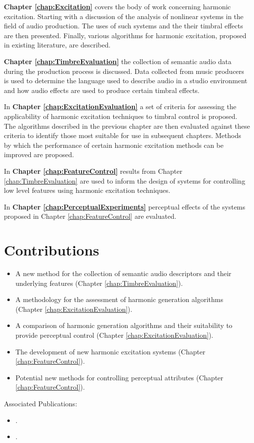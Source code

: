 	{\bf{Chapter \ref{chap:Excitation}}} covers the body of work concerning harmonic excitation. Starting with a
	discussion of the analysis of nonlinear systems in the field of audio production. The uses of such systems and the
	their timbral effects are then presented. Finally, various algorithms for harmonic excitation, proposed in existing
	literature, are described.

	{\bf{Chapter \ref{chap:TimbreEvaluation}}} the collection of semantic audio data during the production process is
	discussed. Data collected from music producers is used to determine the language used to describe audio in a studio
	environment and how audio effects are used to produce certain timbral effects.

	In {\bf{Chapter \ref{chap:ExcitationEvaluation}}} a set of criteria for assessing the applicability of
	harmonic excitation techniques to timbral control is proposed. The algorithms described in the previous chapter are
	then evaluated against these criteria to identify those most suitable for use in subsequent chapters. Methods by
	which the performance of certain harmonic excitation methods can be improved are proposed.

	In {\bf{Chapter \ref{chap:FeatureControl}}} results from Chapter \ref{chap:TimbreEvaluation} are used to inform
	the design of systems for controlling low level features using harmonic excitation techniques.

	In {\bf{Chapter \ref{chap:PerceptualExperiments}}} perceptual effects of the systems proposed in Chapter
	\ref{chap:FeatureControl} are evaluated. 

\section{Contributions}
\label{sec:Introduction-Contributions}


	\begin{itemize}
		\item A new method for the collection of semantic audio descriptors and their underlying features (Chapter
		      \ref{chap:TimbreEvaluation}).
		\item A methodology for the assessment of harmonic generation algorithms (Chapter
		      \ref{chap:ExcitationEvaluation}).
		\item A comparison of harmonic generation algorithms and their suitability to provide perceptual control
		      (Chapter \ref{chap:ExcitationEvaluation}).
		\item The development of new harmonic excitation systems (Chapter \ref{chap:FeatureControl}).
		\item Potential new methods for controlling perceptual attributes (Chapter \ref{chap:FeatureControl}).
	\end{itemize}

	Associated Publications:

	\begin{itemize}
		\item {}.
		\item {}.
	\end{itemize}

